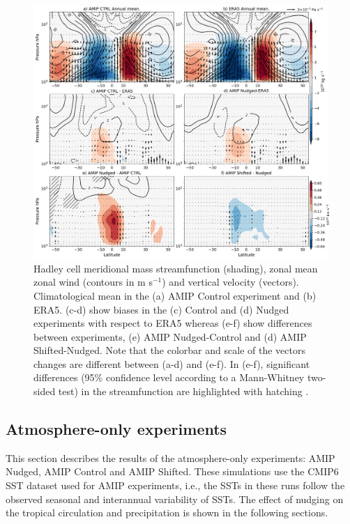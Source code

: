 \begin{figure}[b!]
\centering
 \includegraphics[width=\linewidth]{figures/suite_streamhadleyclim.png}
\caption[Hadley cell in atmosphere-only experiments]{Hadley cell meridional mass streamfunction (shading), zonal mean zonal wind (contours in m s$^{-1}$) and vertical velocity (vectors). Climatological mean in the (a) AMIP Control experiment and (b) ERA5. (c-d) show biases in the (c) Control and (d) Nudged experiments with respect to ERA5 whereas (e-f) show differences between experiments, (e) AMIP Nudged-Control and (d) AMIP Shifted-Nudged. Note that the colorbar and scale of the vectors changes are different between (a-d) and (e-f). In (e-f), significant differences (95\% confidence level according to a Mann-Whitney two-sided test) in the streamfunction are highlighted with hatching . }
\label{fig:hadleyamip}
\end{figure}

\subsection{Atmosphere-only experiments}



This section describes the results of the atmosphere-only experiments: AMIP Nudged, AMIP Control and AMIP Shifted. These simulations use the CMIP6 SST dataset used for AMIP experiments, i.e.,  the SSTs in these runs follow the observed seasonal and interannual variability of SSTs. 
The effect of nudging on the tropical circulation and precipitation is shown in the following sections. %

